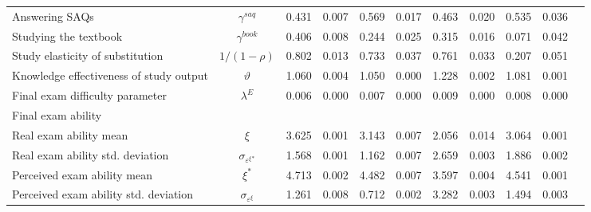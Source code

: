 \documentclass[12pt]{article}
\begin{document}
\begin{landscape}
\begin{table}[htbp]
\begin{tabular}{lcccccccccc}
                       \hspace{0.4cm}Answering SAQs &                 $\gamma^{saq}$ &  0.431 & 0.007 &  0.569 & 0.017 &  0.463 & 0.020 &  0.535 & 0.036 \\
                \hspace{0.4cm}Studying the textbook &                $\gamma^{book}$ &  0.406 & 0.008 &  0.244 & 0.025 &  0.315 & 0.016 &  0.071 & 0.042 \\
                   Study elasticity of substitution &                   $1/(1-\rho)$ &  0.802 & 0.013 &  0.733 & 0.037 &  0.761 & 0.033 &  0.207 & 0.051 \\
            Knowledge effectiveness of study output &                    $\vartheta$ &  1.060 & 0.004 &  1.050 & 0.000 &  1.228 & 0.002 &  1.081 & 0.001 \\
                    Final exam difficulty parameter &                    $\lambda^E$ &  0.006 & 0.000 &  0.007 & 0.000 &  0.009 & 0.000 &  0.008 & 0.000 \\
               \hline
Final exam ability & & & & & & & & & \\
\hspace{0.4cm}Real exam ability mean &                          $\xi$ &  3.625 & 0.001 &  3.143 & 0.007 &  2.056 & 0.014 &  3.064 & 0.001 \\
     \hspace{0.4cm}Real exam ability std. deviation & $\sigma_{\varepsilon^\xi{^*}}$ &  1.568 & 0.001 &  1.162 & 0.007 &  2.659 & 0.003 &  1.886 & 0.002 \\
          \hspace{0.4cm}Perceived exam ability mean &                        $\xi^*$ &  4.713 & 0.002 &  4.482 & 0.007 &  3.597 & 0.004 &  4.541 & 0.001 \\
\hspace{0.4cm}Perceived exam ability std. deviation &     $\sigma_{\varepsilon^\xi}$ &  1.261 & 0.008 &  0.712 & 0.002 &  3.282 & 0.003 &  1.494 & 0.003 \\
\hline
\hline
\end{tabular}
\end{table}
\end{landscape}
\end{document}
